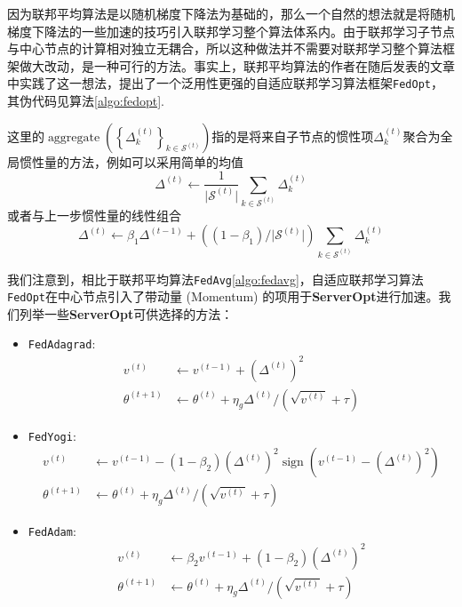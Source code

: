 因为联邦平均算法是以随机梯度下降法为基础的，那么一个自然的想法就是将随机梯度下降法的一些加速的技巧\cite{adagrad, adam, Zaheer_2018_yogi, adamw_amsgrad}引入联邦学习整个算法体系内。由于联邦学习子节点与中心节点的计算相对独立无耦合，所以这种做法并不需要对联邦学习整个算法框架做大改动，是一种可行的方法。事实上，联邦平均算法的作者在随后发表的文章\parencite{reddi2020fed_opt}中实践了这一想法，提出了一个泛用性更强的自适应联邦学习算法框架\texttt{FedOpt}，其伪代码见算法\ref{algo:fedopt}. 



这里的$\operatorname{aggregate} \left( \left\{ \Delta_{k}^{(t)} \right\}_{k \in \mathcal{S}^{(t)}} \right)$指的是将来自子节点的惯性项$\Delta_{k}^{(t)}$聚合为全局惯性量的方法，例如可以采用简单的均值
\begin{equation*}
\Delta^{(t)} \gets \frac{1}{\lvert \mathcal{S}^{(t)} \rvert} \sum\limits_{k \in \mathcal{S}^{(t)}} \Delta_{k}^{(t)}
\end{equation*}
或者与上一步惯性量的线性组合
\begin{equation*}
\Delta^{(t)} \gets \beta_1 \Delta^{(t-1)} + \left( (1 - \beta_1) / \lvert \mathcal{S}^{(t)} \rvert \right) \sum_{k \in \mathcal{S}^{(t)}} \Delta_{k}^{(t)}
\end{equation*}

我们注意到，相比于联邦平均算法\texttt{FedAvg}\ref{algo:fedavg}，自适应联邦学习算法\texttt{FedOpt}在中心节点引入了带动量 (Momentum) 的项用于\textbf{ServerOpt}进行加速。我们列举一些\textbf{ServerOpt}可供选择的方法\cite{reddi2020fed_opt}：
\begin{itemize}
    \item \texttt{FedAdagrad}:
    \begin{equation*}
    \begin{aligned}
    v^{(t)} & \gets v^{(t-1)} + ( \Delta^{(t)} )^2 \\
    \theta^{(t+1)} & \gets \theta^{(t)} + \eta_g \Delta^{(t)} / (\sqrt{v^{(t)}}+\tau)
    \end{aligned}
    \end{equation*}
    \item \texttt{FedYogi}:
    \begin{equation*}
    \begin{aligned}
    v^{(t)} & \gets v^{(t-1)} - (1 - \beta_2) ( \Delta^{(t)} )^2 \operatorname{sign}(v^{(t-1)} - ( \Delta^{(t)} )^2) \\
    \theta^{(t+1)} & \gets \theta^{(t)} + \eta_g \Delta^{(t)} / (\sqrt{v^{(t)}}+\tau)
    \end{aligned}
    \end{equation*}
    \item \texttt{FedAdam}:
    \begin{equation*}
    \begin{aligned}
    v^{(t)} & \gets \beta_2 v^{(t-1)} + (1 - \beta_2) ( \Delta^{(t)} )^2 \\
    \theta^{(t+1)} & \gets \theta^{(t)} + \eta_g \Delta^{(t)} / (\sqrt{v^{(t)}}+\tau)
    \end{aligned}
    \end{equation*}
\end{itemize}

